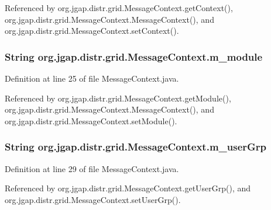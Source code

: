 Referenced by org.\-jgap.\-distr.\-grid.\-Message\-Context.\-get\-Context(), org.\-jgap.\-distr.\-grid.\-Message\-Context.\-Message\-Context(), and org.\-jgap.\-distr.\-grid.\-Message\-Context.\-set\-Context().

\hypertarget{classorg_1_1jgap_1_1distr_1_1grid_1_1_message_context_af9cf96344cf896a761bd2b0b0c64ab49}{
\subsubsection[{m\-\_\-module}]{\setlength{\rightskip}{0pt plus 5cm}String org.\-jgap.\-distr.\-grid.\-Message\-Context.\-m\-\_\-module\hspace{0.3cm}{\ttfamily [private]}}}\label{classorg_1_1jgap_1_1distr_1_1grid_1_1_message_context_af9cf96344cf896a761bd2b0b0c64ab49}


Definition at line 25 of file Message\-Context.\-java.



Referenced by org.\-jgap.\-distr.\-grid.\-Message\-Context.\-get\-Module(), org.\-jgap.\-distr.\-grid.\-Message\-Context.\-Message\-Context(), and org.\-jgap.\-distr.\-grid.\-Message\-Context.\-set\-Module().

\hypertarget{classorg_1_1jgap_1_1distr_1_1grid_1_1_message_context_adc0bc2f35dc2f24e128155957b430dad}{
\subsubsection[{m\-\_\-user\-Grp}]{\setlength{\rightskip}{0pt plus 5cm}String org.\-jgap.\-distr.\-grid.\-Message\-Context.\-m\-\_\-user\-Grp\hspace{0.3cm}{\ttfamily [private]}}}\label{classorg_1_1jgap_1_1distr_1_1grid_1_1_message_context_adc0bc2f35dc2f24e128155957b430dad}


Definition at line 29 of file Message\-Context.\-java.



Referenced by org.\-jgap.\-distr.\-grid.\-Message\-Context.\-get\-User\-Grp(), and org.\-jgap.\-distr.\-grid.\-Message\-Context.\-set\-User\-Grp().


